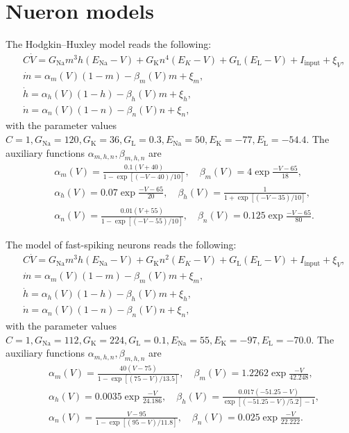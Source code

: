 \section{Nueron models}
\label{sec:neuron-model}

The Hodgkin--Huxley model reads the following:
\begin{align}
    &C\dot{V}=G_{\mathrm{Na}}m^{3}h(E_{\mathrm{Na}}-V)+G_{\mathrm{K}}n^{4}(E_{K}-V)+G_{\mathrm{L}}(E_{\mathrm{L}}-V)+I_{\mathrm{input}}+\xi_{V},\\
    &\dot{m}=\alpha_{m}(V)(1-m)-\beta_{m}(V)m+\xi_{m},\\
    &\dot{h}=\alpha_{h}(V)(1-h)-\beta_{h}(V)m+\xi_{h},\\
    &\dot{n}=\alpha_{n}(V)(1-n)-\beta_{n}(V)n+\xi_{n},
\end{align}
with the parameter values $C=1,G_{\mathrm{Na}}=120,G_{\mathrm{K}}=36,G_{\mathrm{L}}=0.3,E_{\mathrm{Na}}=50,E_{\mathrm{K}}=-77,E_{\mathrm{L}}=-54.4$.
The auxiliary functions $\alpha_{m,h,n},\beta_{m,h,n}$ are
\begin{align}
    &\alpha_{m}(V)=\frac{0.1(V+40)}{1-\exp[(-V-40)/10]},\quad\beta_{m}(V)=4\exp\frac{-V-65}{18},\\
    &\alpha_{h}(V)=0.07\exp\frac{-V-65}{20},\quad\beta_{h}(V)=\frac{1}{1+\exp[(-V-35)/10]},\\
    &\alpha_{n}(V)=\frac{0.01(V+55)}{1-\exp[(-V-55)/10]},\quad\beta_{n}(V)=0.125\exp\frac{-V-65}{80}.
\end{align}

The model of fast-spiking neurons reads the following:
\begin{align}
    &C\dot{V}=G_{\mathrm{Na}}m^{3}h(E_{\mathrm{Na}}-V)+G_{\mathrm{K}}n^{2}(E_{K}-V)+G_{\mathrm{L}}(E_{\mathrm{L}}-V)+I_{\mathrm{input}}+\xi_{V},\\
    &\dot{m}=\alpha_{m}(V)(1-m)-\beta_{m}(V)m+\xi_{m},\\
    &\dot{h}=\alpha_{h}(V)(1-h)-\beta_{h}(V)m+\xi_{h},\\
    &\dot{n}=\alpha_{n}(V)(1-n)-\beta_{n}(V)n+\xi_{n},
\end{align}
with the parameter values $C=1,G_{\mathrm{Na}}=112,G_{\mathrm{K}}=224,G_{\mathrm{L}}=0.1,E_{\mathrm{Na}}=55,E_{\mathrm{K}}=-97,E_{\mathrm{L}}=-70.0$.
The auxiliary functions $\alpha_{m,h,n},\beta_{m,h,n}$ are
\begin{align}
    &\alpha_{m}(V)=\frac{40(V-75)}{1-\exp[(75-V)/13.5]},\quad\beta_{m}(V)=1.2262\exp\frac{-V}{42.248},\\
    &\alpha_{h}(V)=0.0035\exp\frac{-V}{24.186},\quad\beta_{h}(V)=\frac{0.017(-51.25-V)}{\exp[(-51.25-V)/5.2]-1},\\
    &\alpha_{n}(V)=\frac{V-95}{1-\exp[(95-V)/11.8]},\quad\beta_{n}(V)=0.025\exp\frac{-V}{22.222}.
\end{align}

